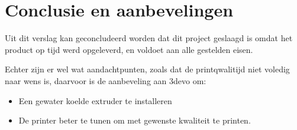 \chapter{Conclusie en aanbevelingen}
\label{Conclusie_en_aanbevelingen}

Uit dit verslag kan geconcludeerd worden dat dit project geslaagd is omdat het
product op tijd werd opgeleverd, en voldoet aan alle gestelden eisen.

Echter zijn er wel wat aandachtpunten, zoals dat de printqwalitijd niet voledig
naar wens is, daarvoor is de aanbeveling aan 3devo om:

\begin{itemize}
    \item Een gewater koelde extruder te installeren
    \item De printer beter te tunen om met gewenste kwaliteit te printen.
\end{itemize}